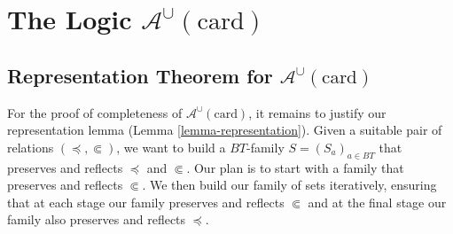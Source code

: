 \documentclass[letterpaper]{article}
\theoremstyle{definition}
\newcommand{\Aunion}{\mathscr{A}^{\cup}}
\newcommand{\card}{\mathrm{card}}
\newcommand{\precsubseteq}{\Subset}
\newcommand{\suitable}{suitable}%
\begin{document}
\section{The Logic $\Aunion(\card)$}

\subsection{Representation Theorem for $\Aunion(\card)$}

For the proof of completeness of $\Aunion(\card)$, it remains to justify our representation lemma (Lemma \ref{lemma-representation}).  Given a \suitable{} pair of relations $(\preceq, \precsubseteq)$, we want to build a $BT$-family $S = (S_a)_{a\in BT}$ that preserves and reflects $\preceq$ and $\precsubseteq$.  Our plan is to start with a family that preserves and reflects $\precsubseteq$.  We then build our family of sets iteratively, ensuring that at each stage our family preserves and reflects $\precsubseteq$ and at the final stage our family also preserves and reflects $\preceq$.
\end{document}
